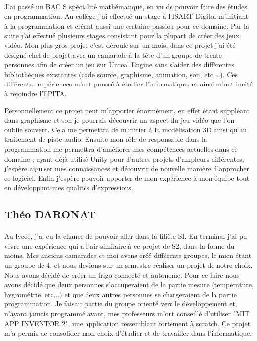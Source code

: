 \documentclass[12pt]{report}
\begin{document}
		\paragraph{}
			J'ai passé un BAC S spécialité mathématique, en vu de pouvoir faire des études en programmation. Au collège j'ai effectué un stage à l'ISART Digital m'initiant à la programmation et créant aussi une certaine passion pour ce domaine. Par la suite j'ai effectué plusieurs stages consistant pour la plupart de créer des jeux vidéo. Mon plus gros projet c'est déroulé sur un mois, dans ce projet j'ai été désigné chef de projet avec un camarade à la tête d'un groupe de trente personnes afin de créer un jeu sur Unreal Engine sans s'aider des différentes bibliothèques existantes (code source, graphisme, animation, son, etc …). Ces différentes expériences m'ont poussé à étudier l'informatique, et ainsi m'ont incité à rejoindre l'EPITA.
			
Personnellement ce projet peut m'apporter énormément, en effet étant suppléant dans graphisme et son je pourrais découvrir un aspect du jeu vidéo que l'on oublie souvent. Cela me permettra de m'initier à la modélisation 3D ainsi qu'au traitement de piste audio. Ensuite mon rôle de responsable dans la programmation me permettra d'améliorer mes compétences actuelles dans ce domaine ; ayant déjà utilisé Unity pour d'autres projets d'ampleurs différentes, j'espère aiguiser mes connaissances et découvrir de nouvelle manière d'approcher ce logiciel. Enfin j'espère pouvoir apporter de mon expérience à mon équipe tout en développant mes qualités d'expressions.

		\subsection{Théo DARONAT}
		\paragraph{}
		
			Au lycée, j'ai eu la chance de pouvoir aller dans la filière SI. En terminal j'ai pu vivre une expérience qui a l'air similaire à ce projet de S2, dans la forme du moins. Mes anciens camarades et moi avons créé différents groupes, le mien étant un groupe de 4, et nous devions sur un semestre réaliser un projet de notre choix. Nous avons décidé de créer un frigo connecté et autonome. Pour ce faire nous avons décidé que deux personnes s'occuperaient de la partie mesure (température, hygrométrie, etc...) et que deux autres personnes se chargeraient de la partie programmation. Je faisait partie du groupe orienté vers le développement et, n'ayant jamais programmé avant, mes professeurs m'ont conseillé d'utiliser "MIT APP INVENTOR 2", une application ressemblant fortement à scratch. Ce projet m'a permis de consolider mon choix d'étudier et de travailler dans l'informatique.\\
			
\end{document}
